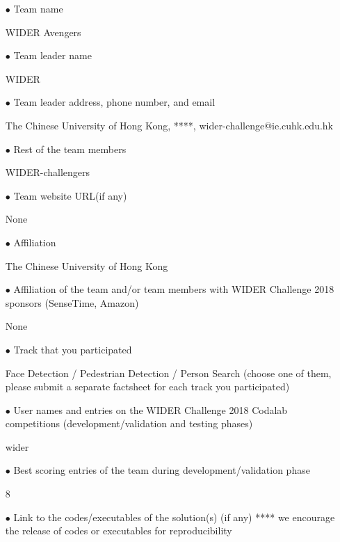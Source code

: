 \documentclass[runningheads]{llncs}
\begin{document}
\begin{spacing}{1.5}
\begin{itemize}

\item[$\bullet$] Team name

WIDER Avengers

\item[$\bullet$] Team leader name

WIDER

\item[$\bullet$] Team leader address, phone number, and email

The Chinese University of Hong Kong, ****, wider-challenge@ie.cuhk.edu.hk

\item[$\bullet$] Rest of the team members

WIDER-challengers

\item[$\bullet$] Team website URL(if any)

None

\item[$\bullet$] Affiliation

The Chinese University of Hong Kong

\item[$\bullet$] Affiliation of the team and/or team members with WIDER Challenge 2018 sponsors (SenseTime, Amazon)

None

\item[$\bullet$]Track that you participated

Face Detection / Pedestrian Detection / Person Search (choose one of them, please submit a separate factsheet for each track you participated)

\item[$\bullet$]User names and entries on the WIDER Challenge 2018 Codalab competitions (development/validation and testing phases)

wider

\item[$\bullet$]Best scoring entries of the team during development/validation phase

8

\item[$\bullet$]Link to the codes/executables of the solution(s) (if any)
**** we encourage the release of codes or executables for reproducibility

\end{itemize}
\end{spacing}
\end{document}
